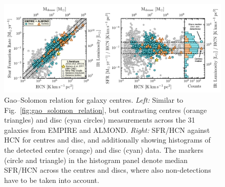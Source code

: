 \documentclass[letter, longauth]{aa} %
\begin{document}
\begin{figure}
\centering
\includegraphics[width=\textwidth]{Figures/Gao_Solomon_relation_centres_compressed.pdf}
\caption{Gao--Solomon relation for galaxy centres. 
\textit{Left:} Similar to Fig.~\ref{fig:gao_solomon_relation}, but contrasting centres (orange triangles) and disc (cyan circles) measurements across the 31 galaxies from EMPIRE and ALMOND.
\textit{Right:} SFR/HCN against HCN for centres and disc, and additionally showing histograms of the detected centre (orange) and disc (cyan) data.
The markers (circle and triangle) in the histogram panel denote median SFR/HCN across the centres and discs, where also non-detections have to be taken into account.
}
\label{fig:centres}
\end{figure}
\end{document}
